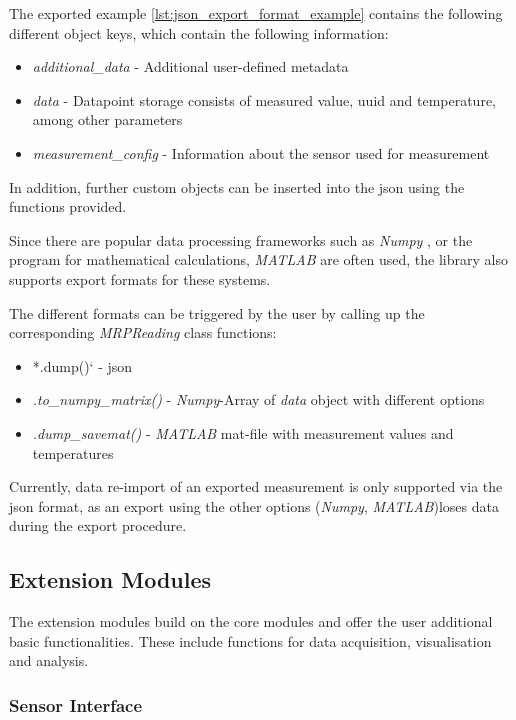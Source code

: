 The exported example \ref{lst:json_export_format_example} contains the
following different object keys, which contain the following
information:

\begin{itemize}
\tightlist
\item
  \emph{additional\_data} - Additional user-defined metadata
\item
  \emph{data} - Datapoint storage consists of measured value, \gls{uuid}
  and temperature, among other parameters
\item
  \emph{measurement\_config} - Information about the sensor used for
  measurement
\end{itemize}

In addition, further custom objects can be inserted into the \gls{json}
using the functions provided.

Since there are popular data processing frameworks such as \emph{Numpy}
\cite{harris2020array}, or the program for mathematical
calculations, \emph{MATLAB} are often used, the library also supports
export formats for these systems.

The different formats can be triggered by the user by calling up the
corresponding \emph{MRPReading} class functions:

\begin{itemize}
\tightlist
\item
  *.dump()` - \gls{json}
\item
  \emph{.to\_numpy\_matrix()} - \emph{Numpy}-Array of \emph{data} object
  with different options
\item
  \emph{.dump\_savemat()} - \emph{MATLAB} mat-file with measurement
  values and temperatures
\end{itemize}

Currently, data re-import of an exported measurement is only supported
via the \gls{json} format, as an export using the other options
(\emph{Numpy}, \emph{MATLAB})loses data during the export procedure.

\hypertarget{extension-modules}{%
\subsection{Extension Modules}\label{extension-modules}}

The extension modules build on the core modules and offer the user
additional basic functionalities. These include functions for data
acquisition, visualisation and analysis.

\hypertarget{sensor-interface}{%
\subsubsection{Sensor Interface}\label{sensor-interface}}

